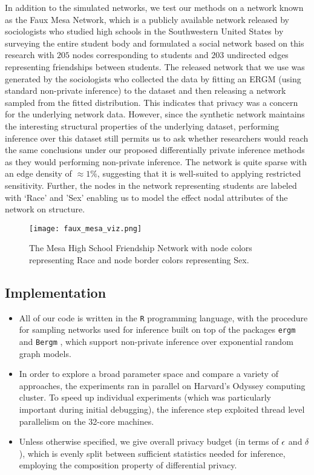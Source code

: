  	 In addition to the simulated networks, we test our methods on a network known as the Faux Mesa Network, which is a publicly available network released by sociologists who studied high schools in the Southwestern United States by surveying the entire student body and formulated a social network based on this research with $205$ nodes corresponding to students and $203$ undirected edges representing friendships between students. \cite{ergm} The released network that we use was generated by the sociologists who collected the data by fitting an ERGM (using standard non-private inference) to the  dataset and then releasing a network sampled from the fitted distribution. This indicates that privacy was a concern for the underlying network data. However, since the synthetic network maintains the interesting structural properties of the underlying dataset, performing inference over this dataset still permits us to ask whether researchers would reach the same conclusions under our proposed differentially private inference methods as they would performing non-private inference. The network is quite sparse with an edge density of $\approx1\%$, suggesting that it is well-suited to applying restricted sensitivity. Further, the nodes in the network representing students are labeled with `Race' and 'Sex' enabling us to model the effect nodal attributes of the network on structure.
 	 
 	 \begin{figure}[!h]
 	 	\centering
 	 	\texttt{[image: faux\_mesa\_viz.png]}
 	 	\caption{The Mesa High School Friendship Network with node colors representing Race and node border colors representing Sex.}
 	 \end{figure}


\subsection*{Implementation}
\begin{itemize}
	\item All of our code is written in the \texttt{R} programming language, with the procedure for sampling networks used for inference built on top of the packages \texttt{ergm} \cite{ergm} and \texttt{Bergm} \cite{Bergm}, which support non-private inference over exponential random graph models.
	\item In order to explore a broad parameter space and compare a variety of approaches, the experiments ran in parallel on Harvard's Odyssey computing cluster. To speed up individual experiments (which was particularly important during initial debugging), the  inference step exploited thread level parallelism  on the 32-core machines.
	\item Unless otherwise specified, we give overall privacy budget (in terms of $\epsilon$ and $\delta$), which is evenly split between sufficient statistics needed for inference, employing the composition property of differential privacy.
\end{itemize}
 
